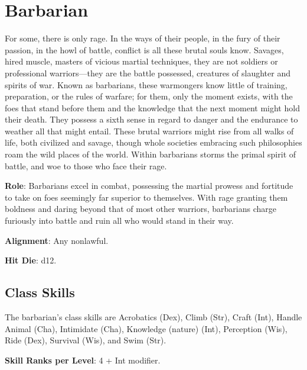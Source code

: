 \section{Barbarian}

\label{f0}				
For some, there is only rage. In the ways of their people, in the fury of their passion, in the howl of battle, conflict is all these brutal souls know. Savages, hired muscle, masters of vicious martial techniques, they are not soldiers or professional warriors---they are the battle possessed, creatures of slaughter and spirits of war. Known as barbarians, these warmongers know little of training, preparation, or the rules of warfare; for them, only the moment exists, with the foes that stand before them and the knowledge that the next moment might hold their death. They possess a sixth sense in regard to danger and the endurance to weather all that might entail. These brutal warriors might rise from all walks of life, both civilized and savage, though whole societies embracing such philosophies roam the wild places of the world. Within barbarians storms the primal spirit of battle, and woe to those who face their rage.
				
\textbf{Role}: Barbarians excel in combat, possessing the martial prowess and fortitude to take on foes seemingly far superior to themselves. With rage granting them boldness and daring beyond that of most other warriors, barbarians charge furiously into battle and ruin all who would stand in their way.
				
\textbf{Alignment}: Any nonlawful.
				
\textbf{Hit Die}: d12.
				
\subsection{Class Skills}

				
The barbarian's class skills are Acrobatics (Dex), Climb (Str), Craft (Int), Handle Animal (Cha), Intimidate (Cha), Knowledge (nature) (Int), Perception (Wis), Ride (Dex), Survival (Wis), and Swim (Str).
				
\textbf{Skill Ranks per Level}: 4 + Int modifier.

